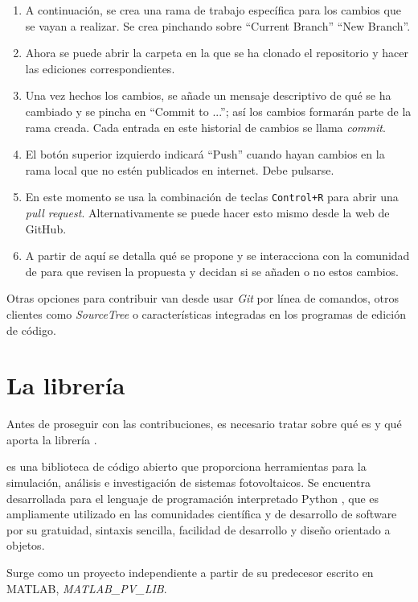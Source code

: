 \begin{enumerate}
    \item A continuación, se crea una \gls{rama} de trabajo específica para los cambios que se vayan a realizar. Se crea pinchando sobre ``Current Branch'' \textrightarrow ``New Branch''.
    \item Ahora se puede abrir la carpeta en la que se ha clonado el repositorio y hacer las ediciones correspondientes.
    \item Una vez hechos los cambios, se añade un mensaje descriptivo de qué se ha cambiado y se pincha en ``Commit to ...''; así los cambios formarán parte de la rama creada. Cada entrada en este historial de cambios se llama \textit{\gls{commit}}.
    \item El botón superior izquierdo indicará ``Push'' cuando hayan cambios en la rama local que no estén publicados en internet. Debe pulsarse.
    \item En este momento se usa la combinación de teclas \texttt{Control+R} para abrir una \textit{\gls{pull request}}. Alternativamente se puede hacer esto mismo desde la web de GitHub.
    \item A partir de aquí se detalla qué se propone y se interacciona con la comunidad de \pvlibpy{} para que revisen la propuesta y decidan si se añaden o no estos cambios.
\end{enumerate}

Otras opciones para contribuir van desde usar \textit{Git} por \gls{línea de comandos}, otros clientes como \textit{SourceTree} o características integradas en los programas de edición de código.

\section{La librería \pvlibpy{}} \label{sct:pvlib}

Antes de proseguir con las contribuciones, es necesario tratar sobre qué es y qué aporta la \gls{librería} \pvlibpy{}.

\pvlibpy{} es una biblioteca de código abierto que proporciona herramientas para la simulación, análisis e investigación de sistemas fotovoltaicos. Se encuentra desarrollada para el lenguaje de programación interpretado \gls{Python} \cite{CS-R9526}, que es ampliamente utilizado en las comunidades científica y de desarrollo de \gls{software} por su gratuidad, sintaxis sencilla, facilidad de desarrollo y diseño orientado a objetos.

Surge como un proyecto independiente a partir de su predecesor escrito en \gls{MATLAB}, \textit{MATLAB\_PV\_LIB}.


